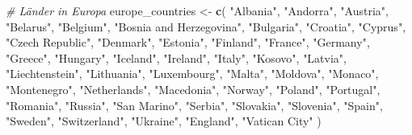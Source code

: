 \documentclass[
]{article}
\newenvironment{Shaded}{\begin{snugshade}}{\end{snugshade}}
\newcommand{\CommentTok}[1]{\textcolor[rgb]{0.56,0.35,0.01}{\textit{#1}}}
\newcommand{\FunctionTok}[1]{\textcolor[rgb]{0.13,0.29,0.53}{\textbf{#1}}}
\newcommand{\NormalTok}[1]{#1}
\newcommand{\OtherTok}[1]{\textcolor[rgb]{0.56,0.35,0.01}{#1}}
\newcommand{\StringTok}[1]{\textcolor[rgb]{0.31,0.60,0.02}{#1}}
\begin{document}
\begin{Shaded}
\begin{Highlighting}[]
\CommentTok{\# Länder in Europa}
\NormalTok{europe\_countries }\OtherTok{\textless{}{-}} \FunctionTok{c}\NormalTok{(}
  \StringTok{"Albania"}\NormalTok{, }\StringTok{"Andorra"}\NormalTok{, }\StringTok{"Austria"}\NormalTok{, }\StringTok{"Belarus"}\NormalTok{, }\StringTok{"Belgium"}\NormalTok{, }
  \StringTok{"Bosnia and Herzegovina"}\NormalTok{, }\StringTok{"Bulgaria"}\NormalTok{, }\StringTok{"Croatia"}\NormalTok{, }\StringTok{"Cyprus"}\NormalTok{, }
  \StringTok{"Czech Republic"}\NormalTok{, }\StringTok{"Denmark"}\NormalTok{, }\StringTok{"Estonia"}\NormalTok{, }\StringTok{"Finland"}\NormalTok{, }\StringTok{"France"}\NormalTok{, }
  \StringTok{"Germany"}\NormalTok{, }\StringTok{"Greece"}\NormalTok{, }\StringTok{"Hungary"}\NormalTok{, }\StringTok{"Iceland"}\NormalTok{, }\StringTok{"Ireland"}\NormalTok{, }\StringTok{"Italy"}\NormalTok{, }
  \StringTok{"Kosovo"}\NormalTok{, }\StringTok{"Latvia"}\NormalTok{, }\StringTok{"Liechtenstein"}\NormalTok{, }\StringTok{"Lithuania"}\NormalTok{, }\StringTok{"Luxembourg"}\NormalTok{, }
  \StringTok{"Malta"}\NormalTok{, }\StringTok{"Moldova"}\NormalTok{, }\StringTok{"Monaco"}\NormalTok{, }\StringTok{"Montenegro"}\NormalTok{, }\StringTok{"Netherlands"}\NormalTok{, }
  \StringTok{"Macedonia"}\NormalTok{, }\StringTok{"Norway"}\NormalTok{, }\StringTok{"Poland"}\NormalTok{, }\StringTok{"Portugal"}\NormalTok{, }\StringTok{"Romania"}\NormalTok{, }
  \StringTok{"Russia"}\NormalTok{, }\StringTok{"San Marino"}\NormalTok{, }\StringTok{"Serbia"}\NormalTok{, }\StringTok{"Slovakia"}\NormalTok{, }\StringTok{"Slovenia"}\NormalTok{, }
  \StringTok{"Spain"}\NormalTok{, }\StringTok{"Sweden"}\NormalTok{, }\StringTok{"Switzerland"}\NormalTok{, }\StringTok{"Ukraine"}\NormalTok{, }\StringTok{"England"}\NormalTok{, }
  \StringTok{"Vatican City"}
\NormalTok{)}


\end{Highlighting}
\end{Shaded}
\end{document}
